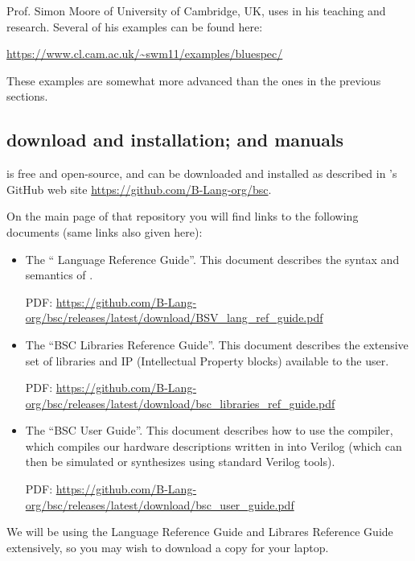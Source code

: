 Prof. Simon Moore of University of Cambridge, UK, uses {\BSV} in his
teaching and research.  Several of his {\BSV} examples can be found here:

\url{https://www.cl.cam.ac.uk/~swm11/examples/bluespec/}

These examples are somewhat more advanced than the ones in the
previous sections.


\subsection{{\bsc} download and installation; {\bsc} and {\BSV} manuals}

{\bsc} is free and open-source, and can be downloaded and installed as
described in {\BSV}'s GitHub web site
\url{https://github.com/B-Lang-org/bsc}.

On the main page of that repository you will find links to the
following documents (same links also given here):

\begin{itemize}

  \item The ``{\BSV} Language Reference Guide''.  This document
  describes the syntax and semantics of {\BSV}.

  PDF: \url{https://github.com/B-Lang-org/bsc/releases/latest/download/BSV_lang_ref_guide.pdf}

  \item The ``BSC Libraries Reference Guide''.  This document
  describes the extensive set of libraries and IP (Intellectual
  Property blocks) available to the {\BSV} user.

  PDF: \url{https://github.com/B-Lang-org/bsc/releases/latest/download/bsc_libraries_ref_guide.pdf}

  \item The ``BSC User Guide''.  This document describes how to use
  the {\bsc} compiler, which compiles our hardware descriptions
  written in {\BSV} into Verilog (which can then be simulated or
  synthesizes using standard Verilog tools).

  PDF: \url{https://github.com/B-Lang-org/bsc/releases/latest/download/bsc_user_guide.pdf}

\end{itemize}

We will be using the Language Reference Guide and Librares Reference
Guide extensively, so you may wish to download a copy for your laptop.

